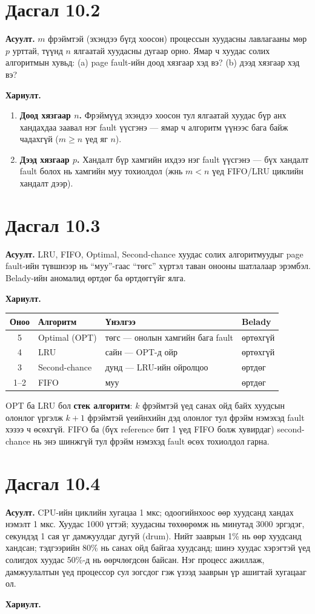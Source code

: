 \documentclass[12pt,a4paper]{article}
\newcommand{\question}[2]{\section{Дасгал #1}\textbf{Асуулт.} #2\par\medskip\textbf{Хариулт.}\par}
\begin{document}
\question{10.2}{$m$ фрэймтэй (эхэндээ бүгд хоосон) процессын хуудасны лавлагааны мөр $p$ урттай, түүнд $n$ ялгаатай хуудасны дугаар орно. Ямар ч хуудас солих алгоритмын хувьд: (a) page fault-ийн доод хязгаар хэд вэ? (b) дээд хязгаар хэд вэ?}

\begin{enumerate}[label=(\alph*), leftmargin=1.5em]
  \item \textbf{Доод хязгаар $n$.} Фрэймүүд эхэндээ хоосон тул ялгаатай хуудас бүр анх хандахдаа заавал нэг fault үүсгэнэ — ямар ч алгоритм үүнээс бага байж чадахгүй ($m \ge n$ үед яг $n$).
  \item \textbf{Дээд хязгаар $p$.} Хандалт бүр хамгийн ихдээ нэг fault үүсгэнэ — бүх хандалт fault болох нь хамгийн муу тохиолдол (жнь $m < n$ үед FIFO/LRU циклийн хандалт дээр).
\end{enumerate}

\question{10.3}{LRU, FIFO, Optimal, Second-chance хуудас солих алгоритмуудыг page fault-ийн түвшнээр нь “муу”-гаас “төгс” хүртэл таван онооны шатлалаар эрэмбэл. Belady-ийн аномалид өртдөг ба өртдөггүйг ялга.}

\begin{center}
\begin{tabular}{cl>{\raggedright}p{5.2cm}l}
\toprule
Оноо & Алгоритм & Үнэлгээ & Belady\\
\midrule
5 & Optimal (OPT) & төгс — онолын хамгийн бага fault & өртөхгүй\\
4 & LRU & сайн — OPT-д ойр & өртөхгүй\\
3 & Second-chance & дунд — LRU-ийн ойролцоо & өртдөг\\
1–2 & FIFO & муу & өртдөг\\
\bottomrule
\end{tabular}
\end{center}
OPT ба LRU бол \textbf{стек алгоритм}: $k$ фрэймтэй үед санах ойд байх хуудсын олонлог үргэлж $k+1$ фрэймтэй үеийнхийн дэд олонлог тул фрэйм нэмэхэд fault хэзээ ч өсөхгүй. FIFO ба (бүх reference бит 1 үед FIFO болж хувирдаг) second-chance нь энэ шинжгүй тул фрэйм нэмэхэд fault өсөх тохиолдол гарна.

\question{10.4}{CPU-ийн циклийн хугацаа 1 мкс; одоогийнхоос өөр хуудсанд хандах нэмэлт 1 мкс. Хуудас 1000 үгтэй; хуудасны төхөөрөмж нь минутад 3000 эргэдэг, секундэд 1 сая үг дамжуулдаг дугуй (drum). Нийт зааврын 1\% нь өөр хуудсанд хандсан; тэдгээрийн 80\% нь санах ойд байгаа хуудсанд; шинэ хуудас хэрэгтэй үед солигдох хуудас 50\%-д нь өөрчлөгдсөн байсан. Нэг процесс ажиллаж, дамжуулалтын үед процессор сул зогсдог гэж үзээд зааврын үр ашигтай хугацааг ол.}
\end{document}
